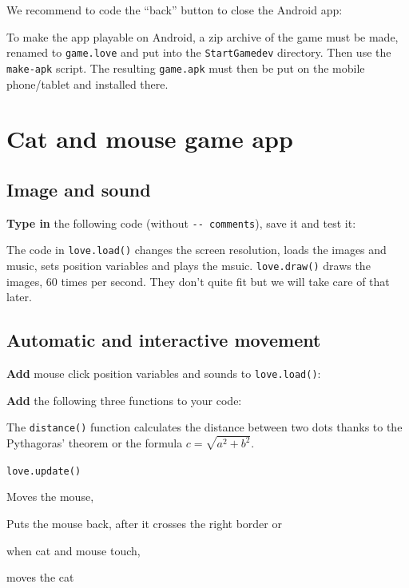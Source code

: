 \documentclass[a4paper, 11pt]{article}
\begin{document}
We recommend to code the ``back'' button to close the Android app:



To make the app playable on Android, a zip archive of the game must be made, renamed to \texttt{game.love} and put into the \texttt{StartGamedev} directory. Then use the \texttt{make-apk} script. The resulting \texttt{game.apk} must then be put on the mobile phone/tablet and installed there.

\newpage

\section{Cat and mouse game app}

\subsection{Image and sound}

\textbf{Type in} the following code (without \texttt{-{}- comments}), save it and test it:



The code in \texttt{love.load()} changes the screen resolution, loads the images and music, sets position variables and plays the msuic. \texttt{love.draw()} draws the images, 60 times per second. They don't quite fit but we will take care of that later.

\newpage

\subsection{Automatic and interactive movement}

\textbf{Add} mouse click position variables and sounds to \texttt{love.load()}:



\textbf{Add} the following three functions to your code:



The \texttt{distance()} function calculates the distance between two dots thanks to the Pythagoras' theorem or the formula $c = \sqrt{a^2 + b^2}$.

\texttt{love.update()}
\begin{enumerate*}
  \item Moves the mouse,
  \item Puts the mouse back, after it crosses the right border or
  \item when cat and mouse touch,
  \item moves the cat
\end{enumerate*}
\end{document}
